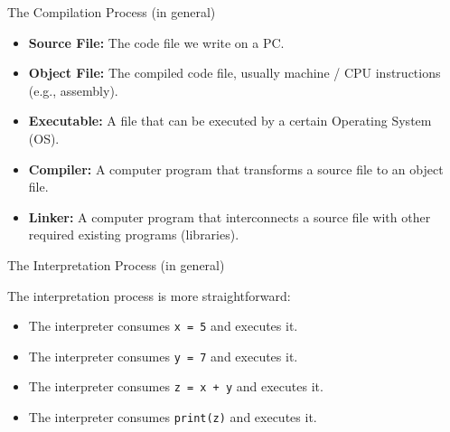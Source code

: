 \documentclass[aspectratio=169, 12pt, xcolor=table]{beamer}
\begin{document}
	\begin{frame}{The Compilation Process (in general)}%
		\begin{minipage}[t]{0.68\textwidth}%
			\vspace{0pt}%
			\begin{itemize}
				\item \textbf{Source File:} The code file we write on a PC.
				\item \textbf{Object File:} The compiled code file, usually machine / CPU instructions (e.g., assembly).
				\item \textbf{Executable:} A file that can be executed by a certain Operating System (OS).
				\item \textbf{Compiler:} A computer program that transforms a source file to an object file.
				\item \textbf{Linker:} A computer program that interconnects a source file with other required existing programs (libraries).
			\end{itemize}
		\end{minipage}\hfill%
		\begin{minipage}[t]{0.3\textwidth}%
			\vspace{0pt}
			\centering
		\end{minipage}
	\end{frame}

	\begin{frame}{The Interpretation Process (in general)}
		\begin{minipage}[t]{0.50\textwidth}
			\vspace{0pt}
			\raggedright
			The interpretation process is more straightforward:
			\begin{itemize}
				\item The interpreter consumes \texttt{x = 5} and executes it.
				\item The interpreter consumes \texttt{y = 7} and executes it.
				\item The interpreter consumes \texttt{z = x + y} and executes it.
				\item The interpreter consumes \texttt{print(z)} and executes it.
			\end{itemize}
		\end{minipage}\hfill
		\begin{minipage}[t]{0.48\textwidth}
			\vspace{0pt}
			\centering
			
		\end{minipage}
	\end{frame}
\end{document}
